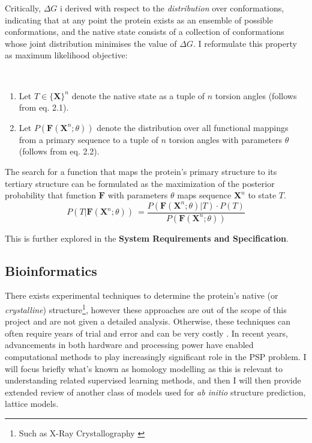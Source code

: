 Critically,  $\Delta G$ i derived with respect to the \emph{distribution}
over conformations, indicating that at any point the protein exists as an
ensemble of possible conformations, and the native state consists of a
collection of conformations whose joint distribution minimises the value of $\Delta G$.
I reformulate this property as maximum likelihood objective:
\begin{theorem}
    \
    \begin{enumerate}
        \item Let $T \in \mathbf{\{X\}}^n$ denote the native state as a tuple of $n$ torsion angles (follows from eq. 2.1).
        \item Let $P(\mathbf{F}(\mathbf{X}^n; \theta))$ denote the distribution over all
        functional mappings from a primary sequence to a tuple of $n$ torsion
        angles with parameters $\theta$ (follows from eq. 2.2).
    \end{enumerate}
    The search for a function that maps the protein's primary structure to its tertiary structure
    can be formulated as the maximization of the posterior probability
    that function $\mathbf{F}$ with parameters $\theta$ maps sequence $\mathbf{X}^n$ to state $T$.
    \begin{equation}
        P(T | \mathbf{F}(\mathbf{X}^n; \theta))\ =\frac{P(\mathbf{F}(\mathbf{X}^n; \theta) | T) \cdot P(T)}{P(\mathbf{F}(\mathbf{X}^n; \theta))}
    \end{equation}
\end{theorem}                                                                                                                                                                                                                                                     
This is further explored in the \textbf{System Requirements and Specification}.

\subsection{Bioinformatics}
There exists experimental techniques to determine the protein's
native (or \emph{crystalline}) structure\footnote{Such as X-Ray Crystallography \cite{Chayen}},
however these approaches are out of the scope of this
project and are not given a detailed analysis. Otherwise,
these techniques can often require years of trial and error 
and can be very costly \cite{alberts}.
In recent years, advancements in both hardware and processing power
have enabled computational methods to play increasingly significant role 
in the PSP problem. I will focus briefly what's known
as homology modelling as this is relevant to understanding related
supervised learning methods, and then I will then provide extended review
of another class of models used for \emph{ab initio} structure prediction,
lattice models.
